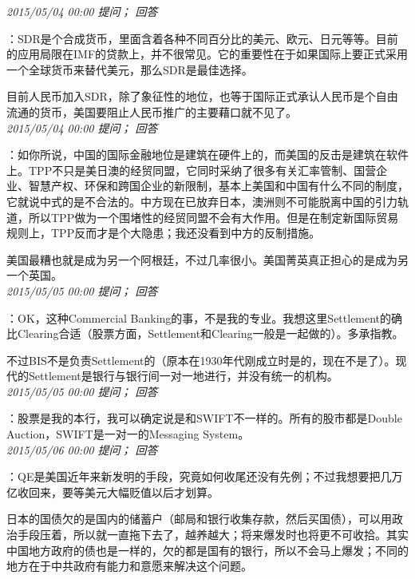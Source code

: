 \documentclass[twocolumn]{ctexart}
\begin{document}
\textit{\hfill\noindent\small 2015/05/04 00:00 提问； 回答}

：SDR是个合成货币，里面含着各种不同百分比的美元、欧元、日元等等。目前的应用局限在IMF的贷款上，并不很常见。它的重要性在于如果国际上要正式采用一个全球货币来替代美元，那么SDR是最佳选择。

目前人民币加入SDR，除了象征性的地位，也等于国际正式承认人民币是个自由流通的货币，美国要阻止人民币推广的主要藉口就不见了。\\

\textit{\hfill\noindent\small 2015/05/04 00:00 提问； 回答}

：如你所说，中国的国际金融地位是建筑在硬件上的，而美国的反击是建筑在软件上。TPP不只是美日澳的经贸同盟，它同时采纳了很多有关汇率管制、国营企业、智慧产权、环保和跨国企业的新限制，基本上美国和中国有什么不同的制度，它就说中式的是不合法的。中方现在已放弃日本，澳洲则不可能脱离中国的引力轨道，所以TPP做为一个围堵性的经贸同盟不会有大作用。但是在制定新国际贸易规则上，TPP反而才是个大隐患；我还没看到中方的反制措施。

美国最糟也就是成为另一个阿根廷，不过几率很小。美国菁英真正担心的是成为另一个英国。\\

\textit{\hfill\noindent\small 2015/05/05 00:00 提问； 回答}

：OK，这种Commercial Banking的事，不是我的专业。我想这里Settlement的确比Clearing合适（股票方面，Settlement和Clearing一般是一起做的）。多承指教。

不过BIS不是负责Settlement的（原本在1930年代刚成立时是的，现在不是了）。现代的Settlement是银行与银行间一对一地进行，并没有统一的机构。\\

\textit{\hfill\noindent\small 2015/05/05 00:00 提问； 回答}

：股票是我的本行，我可以确定说是和SWIFT不一样的。所有的股市都是Double Auction，SWIFT是一对一的Messaging System。\\

\textit{\hfill\noindent\small 2015/05/06 00:00 提问； 回答}

：QE是美国近年来新发明的手段，究竟如何收尾还没有先例；不过我想要把几万亿收回来，要等美元大幅贬值以后才划算。

日本的国债欠的是国内的储蓄户（邮局和银行收集存款，然后买国债），可以用政治手段压着，所以就一直拖下去了，越养越大；将来爆发时也将更不可收拾。其实中国地方政府的债也是一样的，欠的都是国有的银行，所以不会马上爆发；不同的地方在于中共政府有能力和意愿来解决这个问题。\\
\end{document}
